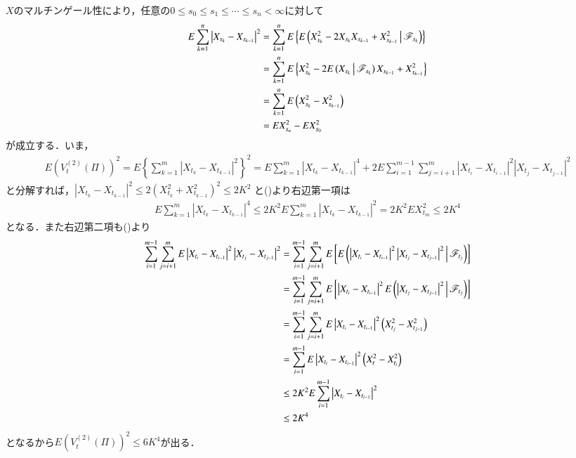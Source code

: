 	\begin{prf}
		$X$のマルチンゲール性により，任意の$0 \leq s_0 \leq s_1 \leq \cdots \leq s_n < \infty$に対して
		\begin{align}
			E \sum_{k=1}^n \left|X_{s_k} - X_{s_{k-1}}\right|^2
			&= \sum_{k=1}^n E \left\{E\left( X_{s_k}^2 -2X_{s_k}X_{s_{k-1}} + X_{s_{k-1}}^2 \, \middle|\, \mathscr{F}_{s_k} \right)\right\} \\
			&= \sum_{k=1}^n E \left\{X_{s_k}^2 -2E\left( X_{s_k} \, \middle|\, \mathscr{F}_{s_k} \right)X_{s_{k-1}} + X_{s_{k-1}}^2\right\} \\
			&= \sum_{k=1}^n E \left( X_{s_k}^2 - X_{s_{k-1}}^2 \right) \\
			&= E X_{s_n}^2 - E X_{s_0}^2
			\label{eq:chapter_1_lemma_5_9_1}
		\end{align}
		が成立する．いま，
		\begin{align}
			E\left( V_t^{(2)}(\Pi) \right)^2
			= E \left\{ \sum_{k=1}^m \left|X_{t_k} - X_{t_{k-1}}\right|^2 \right\}^2
			= E \sum_{k=1}^m \left|X_{t_k} - X_{t_{k-1}}\right|^4
				+ 2 E \sum_{i=1}^{m-1} \sum_{j=i+1}^m 
				\left|X_{t_i} - X_{t_{i-1}}\right|^2\left|X_{t_j} - X_{t_{j-1}}\right|^2
		\end{align}
		と分解すれば，$\left|X_{t_k} - X_{t_{k-1}}\right|^2 \leq 2\left( X_{t_k}^2 + X_{t_{k-1}}^2 \right)^2 \leq 2K^2$
		と()より右辺第一項は
		\begin{align}
			E \sum_{k=1}^m \left|X_{t_k} - X_{t_{k-1}}\right|^4
			\leq 2K^2 E \sum_{k=1}^m \left|X_{t_k} - X_{t_{k-1}}\right|^2
			= 2K^2 E X_{t_m}^2
			\leq 2K^4
		\end{align}
		となる．また右辺第二項も()より
		\begin{align}
			\sum_{i=1}^{m-1} \sum_{j=i+1}^m 
				E \left|X_{t_i} - X_{t_{i-1}}\right|^2\left|X_{t_j} - X_{t_{j-1}}\right|^2
			&= \sum_{i=1}^{m-1} \sum_{j=i+1}^m 
				E \left[ E\left( \left|X_{t_i} - X_{t_{i-1}}\right|^2 
				\left|X_{t_j} - X_{t_{j-1}}\right|^2 \, \middle|\, \mathscr{F}_{t_j} \right) \right] \\
			&= \sum_{i=1}^{m-1} \sum_{j=i+1}^m 
				E \left[\left|X_{t_i} - X_{t_{i-1}}\right|^2
				E\left( \left|X_{t_j} - X_{t_{j-1}}\right|^2 \, \middle|\, \mathscr{F}_{t_j} \right) \right] \\
			&= \sum_{i=1}^{m-1} \sum_{j=i+1}^m 
				E \left|X_{t_i} - X_{t_{i-1}}\right|^2 \left( X_{t_j}^2 - X_{t_{j-1}}^2 \right) \\
			&= \sum_{i=1}^{m-1} E \left|X_{t_i} - X_{t_{i-1}}\right|^2 \left( X_t^2 - X_{t_i}^2 \right) \\
			&\leq 2K^2 E \sum_{i=1}^{m-1} \left|X_{t_i} - X_{t_{i-1}}\right|^2 \\
			&\leq 2K^4
		\end{align}
		となるから$E\left( V_t^{(2)}(\Pi) \right)^2 \leq 6K^4$が出る．
		\QED
	\end{prf}
	
